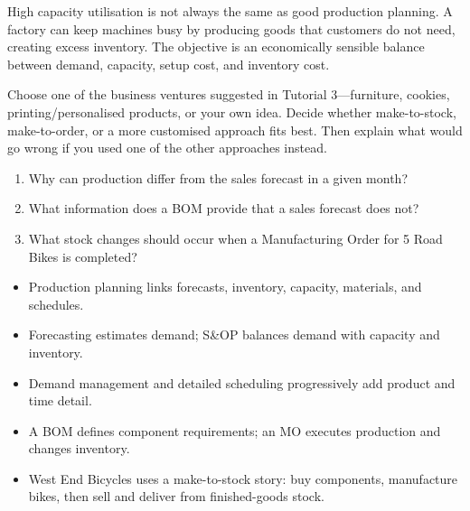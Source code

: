 \begin{pitfall}
High capacity utilisation is not always the same as good production planning. A factory can keep machines busy by producing goods that customers do not need, creating excess inventory. The objective is an economically sensible balance between demand, capacity, setup cost, and inventory cost.
\end{pitfall}

\begin{tryit}
Choose one of the business ventures suggested in Tutorial 3---furniture, cookies, printing/personalised products, or your own idea. Decide whether make-to-stock, make-to-order, or a more customised approach fits best. Then explain what would go wrong if you used one of the other approaches instead.
\end{tryit}

\begin{quickcheck}
\begin{enumerate}
  \item Why can production differ from the sales forecast in a given month?
  \item What information does a BOM provide that a sales forecast does not?
  \item What stock changes should occur when a Manufacturing Order for 5 Road Bikes is completed?
\end{enumerate}
\end{quickcheck}

\begin{chapterrecap}
\begin{itemize}
  \item Production planning links forecasts, inventory, capacity, materials, and schedules.
  \item Forecasting estimates demand; S\&OP balances demand with capacity and inventory.
  \item Demand management and detailed scheduling progressively add product and time detail.
  \item A BOM defines component requirements; an MO executes production and changes inventory.
  \item West End Bicycles uses a make-to-stock story: buy components, manufacture bikes, then sell and deliver from finished-goods stock.
\end{itemize}
\end{chapterrecap}
